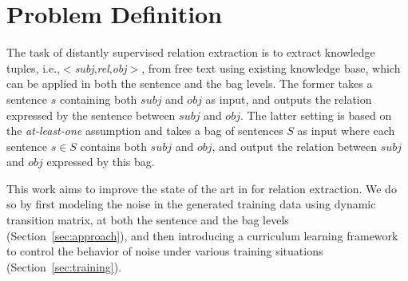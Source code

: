 \section{Problem Definition}
The task of distantly supervised relation extraction is to extract knowledge tuples, i.e.,$<$\emph{subj},\emph{rel},\emph{obj}$>$, from free text using existing knowledge base, which can be applied in both the sentence and the bag
levels.  The former  takes a sentence $s$ containing both $subj$ and $obj$ as input, and outputs the relation expressed
by the sentence between $subj$ and $obj$. The latter setting is based on the \textit{at-least-one} assumption
 and takes a bag of sentences $S$ as input where each sentence
$s\in S$ contains both $subj$ and
$obj$, and output  the relation between $subj$ and $obj$ expressed by this bag.


This work aims to improve the state of the art in \DS for relation extraction. 
We do so by first modeling the noise in the \DS generated training data using dynamic transition matrix,  at both the sentence and the bag levels (Section~\ref{sec:approach}),  and then introducing a curriculum learning framework  to control the behavior of noise  under various training situations (Section~\ref{sec:training}).






